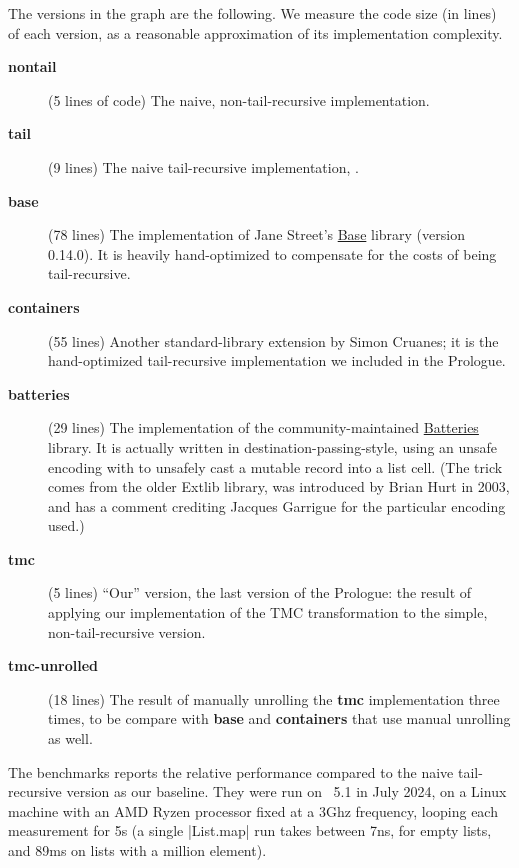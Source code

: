 \newcommand{\bench}[1]{\textbf{#1}}

The  versions in the graph are the following. We measure the code size (in lines) of each version, as a reasonable approximation of its implementation complexity.
\begin{description}
\item[\bench{nontail}] (5 lines of code) The naive, non-tail-recursive implementation.
\item[\bench{tail}] (9 lines) The naive tail-recursive implementation,
  .
\item[\bench{base}] (78 lines) The implementation of Jane Street's
  \href{https://github.com/janestreet/base}{Base} library
  (version 0.14.0). It is heavily hand-optimized to compensate for the costs
  of being tail-recursive.
\item[\bench{containers}] (55 lines) Another standard-library extension by Simon
  Cruanes; it is the hand-optimized tail-recursive implementation we
  included in the Prologue.
\item[\bench{batteries}] (29 lines) The implementation of the community-maintained
  \href{https://github.com/ocaml-batteries-team/batteries-included/}{Batteries}
  library. It is actually written in destination-passing-style, using
  an unsafe encoding with  to unsafely cast a mutable
  record into a list cell. (The trick comes from the older Extlib
  library, was introduced by Brian Hurt in 2003, and has a comment crediting Jacques
  Garrigue for the particular encoding used.)
\item[\bench{tmc}] (5 lines) ``Our'' version, the last version of the Prologue: the
  result of applying our implementation of the TMC transformation to
  the simple, non-tail-recursive version.
\item[\bench{tmc-unrolled}] (18 lines) The result of manually unrolling the \bench{tmc} implementation three times, to be compare with \bench{base} and \bench{containers} that use manual unrolling as well.
\end{description}

The benchmarks reports the relative performance compared to the naive tail-recursive version as our baseline. They were run on \OCaml~5.1 in July 2024, on a Linux machine with an AMD Ryzen processor fixed at a 3Ghz frequency, looping each measurement for 5s (a single \ocaml|List.map| run takes between 7ns, for empty lists, and 89ms on lists with a million element).

